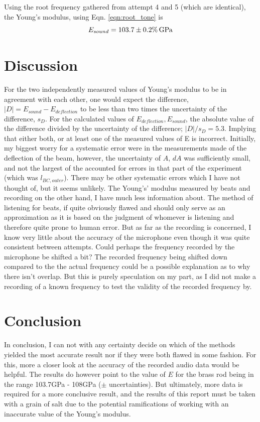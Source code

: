 \documentclass[11pt,a4paper]{article}
\begin{document}
    Using the root frequency gathered from attempt 4 and 5 (which are identical), the Young's modulus, using Eqn. \ref{eqn:root_tone} is
    \begin{equation}
      E_{sound} = 103.7 \pm 0.2 \% \,\textup{G}\textup{Pa}
    \end{equation}


\newpage
\section{\label{sect:discussion}Discussion}
  For the two independently measured values of Young's modulus to be in agreement with each other, one would expect the difference, $|D|=E_{sound} - E_{deflection}$ to be less than two times the uncertainty of the difference, $s_D$. For the calculated values of $E_{deflection},E_{sound}$, the absolute value of the difference divided by the uncertainty of the difference; $|D|/s_D = 5.3$. Implying that either both, or at least one of the measured values of E is incorrect.
  \newline
  \newline
  Initially, my biggest worry for a systematic error were in the measurements made of the deflection of the beam, however, the uncertainty of $A$, $dA$ was sufficiently small, and not the largest of the accounted for errors in that part of the experiment (which was $l_{BC, outer}$). There may be other systematic errors which I have not thought of, but it seems unlikely.
  \newline
  \newline
  The Young's' modulus measured by beats and recording on the other hand, I have much less information about. The method of listening for beats, if quite obviously flawed and should only serve as an approximation as it is based on the judgment of whomever is listening and therefore quite prone to human error. But as far as the recording is concerned, I know very little about the accuracy of the microphone even though it was quite consistent between attempts. Could perhaps the frequency recorded by the microphone be shifted a bit? The recorded frequency being shifted down compared to the the actual frequency could be a possible explanation as to why there isn't overlap. But this is purely speculation on my part, as I did not make a recording of a known frequency to test the validity of the recorded frequency by.

\section{\label{sect:conclusion}Conclusion}
  In conclusion, I can not with any certainty decide on which of the methods yielded the most accurate result nor if they were both flawed in some fashion. For this, more a closer look at the accuracy of the recorded audio data would be helpful. The results do however point to the value of $E$ for the brass rod being in the range 103.7GPa - 108GPa ($\pm$ uncertainties). But ultimately, more data is required for a more conclusive result, and the results of this report must be taken with a grain of salt due to the potential ramifications of working with an inaccurate value of the Young's modulus.
\end{document}
